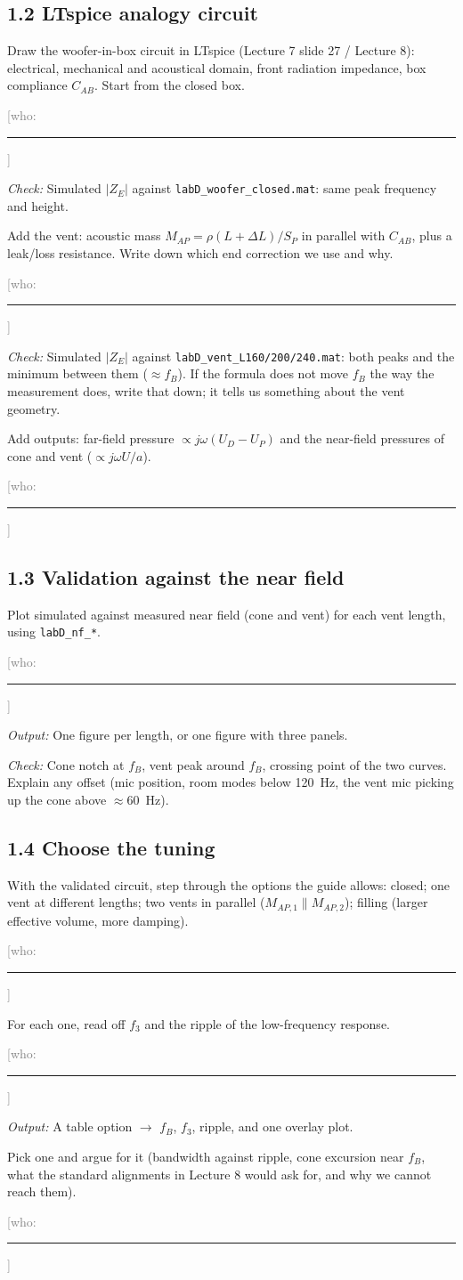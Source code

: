 \documentclass[a4paper,10pt]{article}
\newcommand{\file}[1]{\nolinkurl{#1}}
\newcommand{\who}{\textcolor{gray}{[who: \rule{1.6cm}{0.4pt}]}}
\newcommand{\out}[1]{\par\hspace*{1.2em}\textit{Output:} #1}
\newcommand{\chk}[1]{\par\hspace*{1.2em}\textit{Check:} #1}
\begin{document}
\subsection*{1.2 LTspice analogy circuit}
\begin{todo}
\item Draw the woofer-in-box circuit in LTspice (Lecture 7 slide 27 / Lecture 8): electrical,
  mechanical and acoustical domain, front radiation impedance, box compliance $C_{AB}$. Start
  from the closed box. \who
  \chk{Simulated $|Z_E|$ against \file{labD_woofer_closed.mat}: same peak frequency and height.}
\item Add the vent: acoustic mass $M_{AP} = \rho(L + \Delta L)/S_P$ in parallel with $C_{AB}$,
  plus a leak/loss resistance. Write down which end correction we use and why. \who
  \chk{Simulated $|Z_E|$ against \file{labD_vent_L160/200/240.mat}: both peaks and the minimum
  between them ($\approx f_B$). If the formula does not move $f_B$ the way the measurement does,
  write that down; it tells us something about the vent geometry.}
\item Add outputs: far-field pressure $\propto j\omega(U_D - U_P)$ and the near-field pressures
  of cone and vent ($\propto j\omega U/a$). \who
\end{todo}

\subsection*{1.3 Validation against the near field}
\begin{todo}
\item Plot simulated against measured near field (cone and vent) for each vent length, using
  \file{labD_nf_*}. \who
  \out{One figure per length, or one figure with three panels.}
  \chk{Cone notch at $f_B$, vent peak around $f_B$, crossing point of the two curves. Explain any
  offset (mic position, room modes below \SI{120}{Hz}, the vent mic picking up the cone above
  $\approx$\SI{60}{Hz}).}
\end{todo}

\subsection*{1.4 Choose the tuning}
\begin{todo}
\item With the validated circuit, step through the options the guide allows: closed; one vent at
  different lengths; two vents in parallel ($M_{AP,1} \parallel M_{AP,2}$); filling (larger
  effective volume, more damping). \who
\item For each one, read off $f_3$ and the ripple of the low-frequency response. \who
  \out{A table option $\to$ $f_B$, $f_3$, ripple, and one overlay plot.}
\item Pick one and argue for it (bandwidth against ripple, cone excursion near $f_B$, what the
  standard alignments in Lecture 8 would ask for, and why we cannot reach them). \who
\end{todo}
\end{document}
